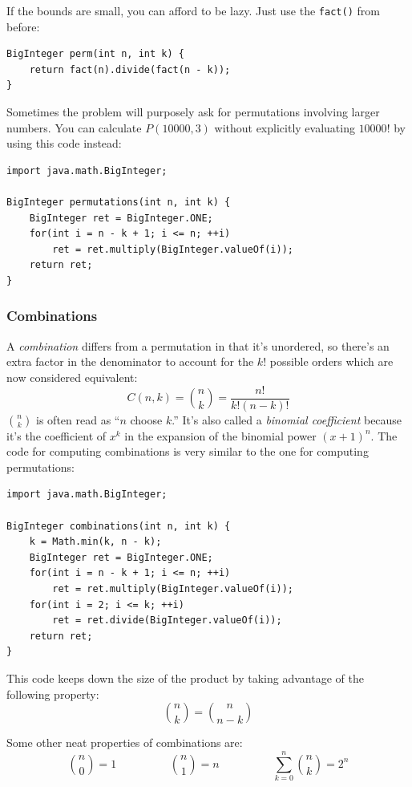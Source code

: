 \documentclass[a4paper,12pt]{article}
\begin{document}
If the bounds are small, you can afford to be lazy. Just use the \lstinline/fact()/ from before:
\begin{lstlisting}
BigInteger perm(int n, int k) {
	return fact(n).divide(fact(n - k));
}
\end{lstlisting}

\noindent Sometimes the problem will purposely ask for permutations involving larger numbers. You can calculate $P(10000,3)$ without explicitly evaluating $10000!$ by using this code instead:
\begin{lstlisting}
import java.math.BigInteger;

BigInteger permutations(int n, int k) {
	BigInteger ret = BigInteger.ONE;
	for(int i = n - k + 1; i <= n; ++i)
		ret = ret.multiply(BigInteger.valueOf(i));
	return ret;
}
\end{lstlisting}

\subsubsection{Combinations}
A {\em combination} differs from a permutation in that it's unordered, so there's an extra factor in the denominator to account for the $k!$ possible orders which are now considered equivalent:
\[C(n,k) = {n \choose k} = \frac{n!}{k!(n-k)!}\]
\noindent ${n \choose k}$ is often read as ``$n$ choose $k$.'' It's also called a {\em binomial coefficient} because it's the coefficient of $x^k$ in the expansion of the binomial power $\left(x+1\right)^n$. The code for computing combinations is very similar to the one for computing permutations:

\begin{lstlisting}
import java.math.BigInteger;

BigInteger combinations(int n, int k) {
	k = Math.min(k, n - k);
	BigInteger ret = BigInteger.ONE;
	for(int i = n - k + 1; i <= n; ++i)
		ret = ret.multiply(BigInteger.valueOf(i));
	for(int i = 2; i <= k; ++i)
		ret = ret.divide(BigInteger.valueOf(i));
	return ret;
}
\end{lstlisting}

This code keeps down the size of the product by taking advantage of the following property:
\[{n \choose k}={n \choose {n-k}}\]

Some other neat properties of combinations are:
\[{n \choose 0}=1 \hspace{2cm} {n \choose 1}=n \hspace{2cm} \sum_{k=0}^{n}{n \choose k}=2^n\]
\end{document}
